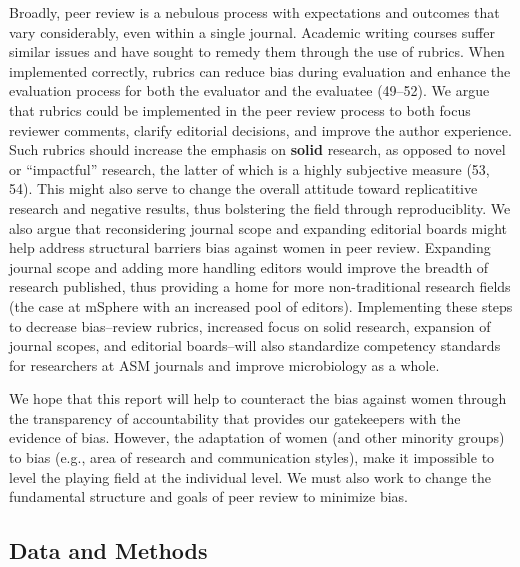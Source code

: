 \documentclass[11pt,]{article}
\begin{document}
Broadly, peer review is a nebulous process with expectations and
outcomes that vary considerably, even within a single journal. Academic
writing courses suffer similar issues and have sought to remedy them
through the use of rubrics. When implemented correctly, rubrics can
reduce bias during evaluation and enhance the evaluation process for
both the evaluator and the evaluatee (49--52). We argue that rubrics
could be implemented in the peer review process to both focus reviewer
comments, clarify editorial decisions, and improve the author
experience. Such rubrics should increase the emphasis on \textbf{solid}
research, as opposed to novel or ``impactful'' research, the latter of
which is a highly subjective measure (53, 54). This might also serve to
change the overall attitude toward replicatitive research and negative
results, thus bolstering the field through reproduciblity. We also argue
that reconsidering journal scope and expanding editorial boards might
help address structural barriers bias against women in peer review.
Expanding journal scope and adding more handling editors would improve
the breadth of research published, thus providing a home for more
non-traditional research fields (the case at mSphere with an increased
pool of editors). Implementing these steps to decrease bias--review
rubrics, increased focus on solid research, expansion of journal scopes,
and editorial boards--will also standardize competency standards for
researchers at ASM journals and improve microbiology as a whole.

We hope that this report will help to counteract the bias against women
through the transparency of accountability that provides our gatekeepers
with the evidence of bias. However, the adaptation of women (and other
minority groups) to bias (e.g., area of research and communication
styles), make it impossible to level the playing field at the individual
level. We must also work to change the fundamental structure and goals
of peer review to minimize bias.

\subsection{Data and Methods}\label{data-and-methods}
\end{document}
